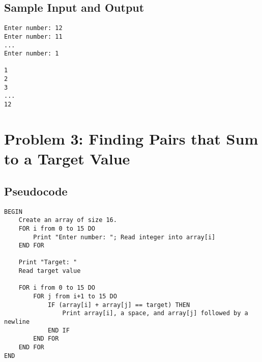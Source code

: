 \documentclass[a4paper]{article}
\begin{document}
\vspace{10mm}
\subsection*{Sample Input and Output}
\begin{verbatim}
Enter number: 12
Enter number: 11
...
Enter number: 1

1
2
3
...
12
\end{verbatim}

\newpage

\section*{Problem 3: Finding Pairs that Sum to a Target Value}

\subsection*{Pseudocode}
\begin{verbatim}
BEGIN
    Create an array of size 16.
    FOR i from 0 to 15 DO
        Print "Enter number: "; Read integer into array[i]
    END FOR
    
    Print "Target: "
    Read target value

    FOR i from 0 to 15 DO
        FOR j from i+1 to 15 DO
            IF (array[i] + array[j] == target) THEN
                Print array[i], a space, and array[j] followed by a newline
            END IF
        END FOR
    END FOR
END
\end{verbatim}

\vspace{2mm}
\end{document}
